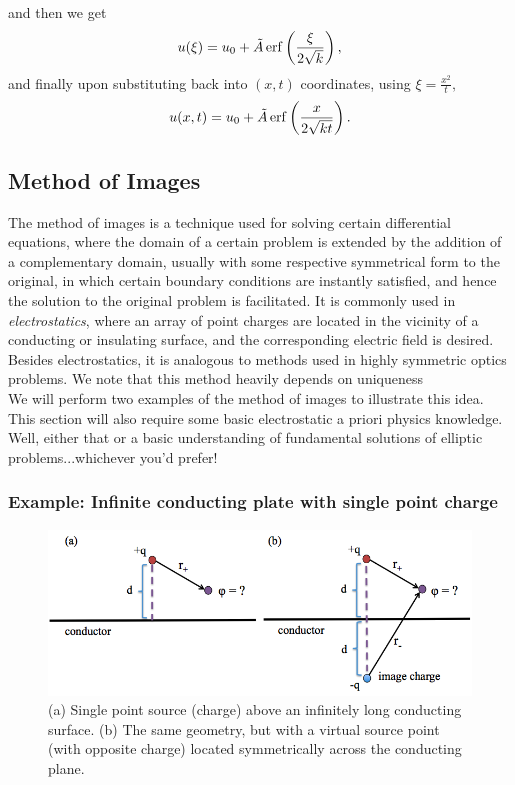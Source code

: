 \begin{enumerate}
and then we get $$u(\xi) = u_0 + \tilde{A} \operatorname{erf}\left( \frac{\xi}{2\sqrt{k}}  \right),$$
and finally upon substituting back into $(x,t)$ coordinates, using $\xi = \frac{x^2}{t},$ $$u(x,t) = u_0 + \tilde{A} \operatorname{erf}\left( \frac{x}{2\sqrt{kt}} \right).$$

\end{enumerate}


%
%

\subsection{Method of Images}

The method of images is a technique used for solving certain differential equations, where the domain of a certain problem is extended by the addition of a complementary domain, usually with some respective symmetrical form to the original, in which certain boundary conditions are instantly satisfied, and hence the solution to the original problem is facilitated. It is commonly used in \emph{electrostatics}, where an array of point charges are located in the vicinity of a conducting or insulating surface, and the corresponding electric field is desired.  Besides electrostatics, it is analogous to methods used in highly symmetric optics problems. We note that this method heavily depends on uniqueness\\

We will perform two examples of the method of images to illustrate this idea. This section will also require some basic electrostatic a priori physics knowledge. Well, either that or a basic understanding of fundamental solutions of elliptic problems...whichever you'd prefer! \\

%
%
\subsubsection{Example: Infinite conducting plate with single point charge}

\begin{figure}[h!]
\centering
\includegraphics[width=5.5in]{moi_geo1.png}
\caption{(a) Single point source (charge) above an infinitely long conducting surface. (b) The same geometry, but with a virtual source point (with opposite charge) located symmetrically across the conducting plane.}
\label{MOI_geo1}
\end{figure}


